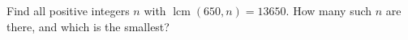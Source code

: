 Find all positive integers $n$ with $\operatorname{lcm}(650,n)=13650$. How many such $n$ are there, and which is the smallest?
